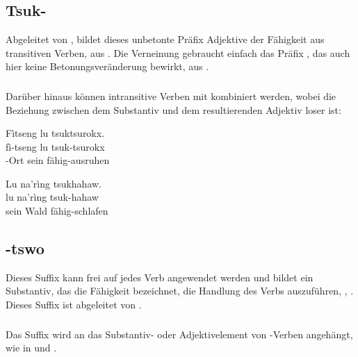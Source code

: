 \subsection{Tsuk-} Abgeleitet von , bildet dieses unbetonte Präfix Adjektive der Fähigkeit aus transitiven Verben,   aus  . Die Verneinung gebraucht einfach das Präfix , das auch hier keine Betonungsveränderung bewirkt,   aus  .

\subsubsection{} Darüber hinaus können intransitive Verben mit  kombiniert werden, wobei die Beziehung zwischen dem Substantiv und dem resultierenden Adjektiv loser ist: 

\begin{interlin}
	\glll \Npawl{}Fìtseng lu tsuktsurokx. \\
	fì-tseng lu tsuk-tsurokx \\
	-Ort sein fähig-ausruhen \\
\end{interlin}

\begin{interlin}
	\glll \Npawl{}Lu na'rìng tsukhahaw. \\
	lu na'rìng tsuk-hahaw \\
	sein Wald fähig-schlafen \\
\end{interlin}

\subsection{-tswo} Dieses Suffix kann frei auf jedes Verb angewendet werden und bildet ein Substantiv, das die Fähigkeit bezeichnet, die Handlung des Verbs auszuführen,  ,  . Dieses Suffix ist abgeleitet von  .

\subsubsection{} Das Suffix  wird an das Substantiv- oder Adjektivelement von -Verben angehängt, wie in   und  .

